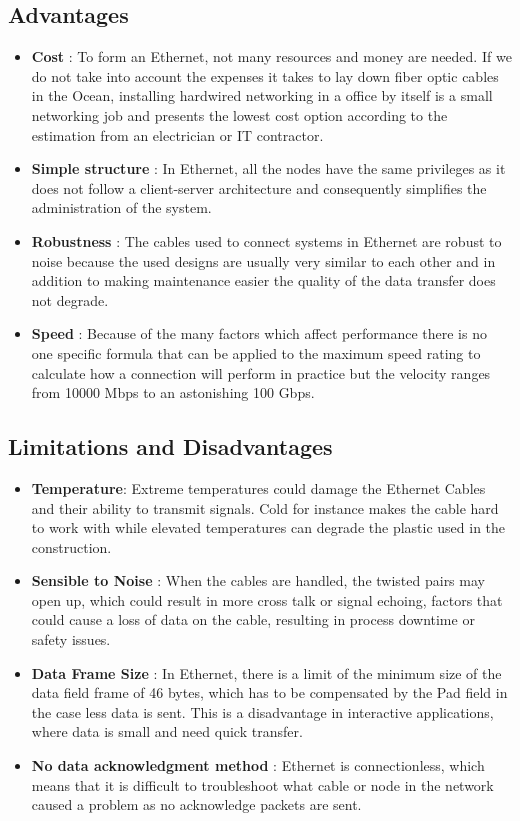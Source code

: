 \documentclass{article}
\begin{document}
\subsection{Advantages}

\begin{itemize}
\item \textbf{Cost} : To form an Ethernet, not many resources and money are needed. If we do not take into account the expenses it takes to lay down fiber optic cables in the Ocean, installing hardwired networking in a office by itself is a small networking  job and presents the lowest cost option according to the estimation from an electrician or IT contractor. 
\item \textbf{Simple structure }: In Ethernet, all the nodes have the same privileges as it does not follow a  client-server architecture and consequently simplifies the administration of the system.
\item \textbf{Robustness} :  The cables used to connect systems in Ethernet are robust to noise because the used designs are usually very similar to each other and in addition to making maintenance easier the quality of the data transfer does not degrade.
\item \textbf{Speed} : Because of the many factors which affect performance there is no one specific formula that can be applied to the maximum speed rating to calculate how a connection will perform in practice but the velocity ranges from 10000 Mbps to an astonishing 100 Gbps.
\end{itemize}

\subsection{Limitations and Disadvantages}

\begin{itemize}
\item \textbf{Temperature}: Extreme temperatures could damage the Ethernet Cables and their ability to transmit signals. Cold for instance makes the cable hard to work with while elevated temperatures can degrade the plastic used in the construction. 
\item \textbf{Sensible to Noise} : When the cables are handled, the twisted pairs may open up, which could result in more cross talk or signal echoing,  factors that could cause a loss of data on the cable, resulting in process downtime or safety issues.
\item \textbf{Data Frame Size} : In Ethernet, there is a limit of the minimum size of the data field frame of 46 bytes, which has to be compensated by the Pad field in the case less data is sent. This is a disadvantage in interactive applications, where data is small and need quick transfer.
\item \textbf{No data acknowledgment method} : Ethernet is connectionless, which means that it is difficult to troubleshoot what cable or node in the network caused a problem as no acknowledge packets are sent.
\end{itemize}
\end{document}
